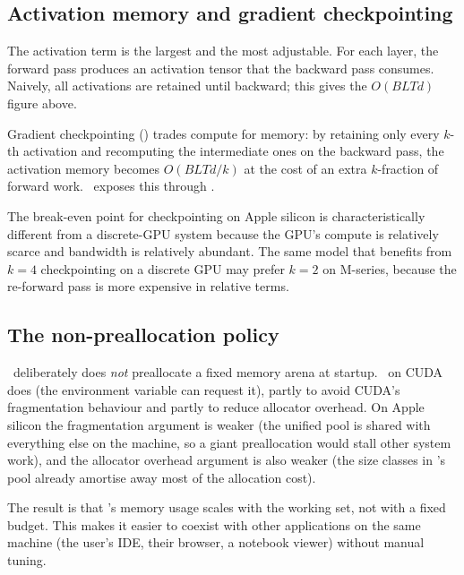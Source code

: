 \subsection{Activation memory and gradient checkpointing}
\label{ssec:unified_memory:checkpointing}

The activation term is the largest and the most adjustable. For each
layer, the forward pass produces an activation tensor that the
backward pass consumes. Naively, all activations are retained until
backward; this gives the \(O(BLTd)\) figure above.

Gradient checkpointing () trades
compute for memory: by retaining only every \(k\)-th activation and
recomputing the intermediate ones on the backward pass, the
activation memory becomes \(O(BLTd / k)\) at the cost of an extra
\(k\)-fraction of forward work. \Lucid\ exposes this through
.

The break-even point for checkpointing on Apple silicon is
characteristically different from a discrete-GPU system because the
GPU's compute is relatively scarce and bandwidth is relatively
abundant. The same model that benefits from \(k = 4\) checkpointing
on a discrete GPU may prefer \(k = 2\) on M-series, because the
re-forward pass is more expensive in relative terms.

\subsection{The non-preallocation policy}
\label{ssec:unified_memory:no_prealloc}

\Lucid\ deliberately does \emph{not} preallocate a fixed memory
arena at startup. \ on CUDA does (the
 environment variable can request
it), partly to avoid CUDA's fragmentation behaviour and partly to
reduce allocator overhead. On Apple silicon the fragmentation
argument is weaker (the unified pool is shared with everything else
on the machine, so a giant preallocation would stall other system
work), and the allocator overhead argument is also weaker (the size
classes in \Lucid's pool already amortise away most of the
allocation cost).

The result is that \Lucid's memory usage scales with the working
set, not with a fixed budget. This makes it easier to coexist with
other applications on the same machine (the user's IDE, their
browser, a notebook viewer) without manual tuning.

